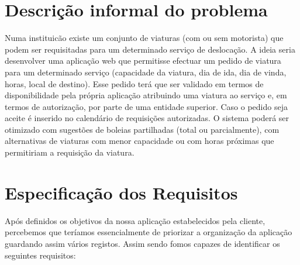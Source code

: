 \documentclass[11pt,a4paper]{report}%
\begin{document}
\section{Descrição informal do problema}
Numa instituicão existe um conjunto de viaturas (com ou sem motorista) que podem ser requisitadas para um determinado serviço de deslocação. A ideia seria desenvolver uma aplicação web que permitisse efectuar um pedido de viatura para um determinado serviço (capacidade da viatura, dia de ida, dia de vinda, horas, local de destino).
Esse pedido terá que ser validado em termos de disponibilidade pela própria aplicação atribuindo uma viatura ao serviço e, em termos de autorização, por parte de uma entidade superior. Caso o pedido seja aceite é inserido no calendário de requisições autorizadas. O sistema poderá ser otimizado com sugestões de boleias partilhadas (total ou parcialmente), com alternativas de viaturas com menor capacidade ou com horas próximas que permitiriam a requisição da viatura.
\label{sec:descricaoProblema} %
\newpage
\section{Especificação dos Requisitos}
Após definidos os objetivos da nossa aplicação estabelecidos pela cliente, percebemos que teríamos essencialmente de priorizar a organização da aplicação guardando assim vários registos. Assim sendo fomos capazes de identificar os seguintes requisitos: \newline
\end{document}
